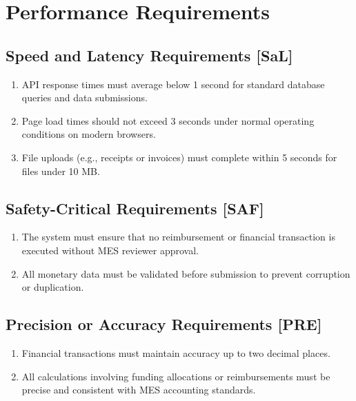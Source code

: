 \documentclass[12pt]{article}
\begin{document}
\section{Performance Requirements}
  \subsection{Speed and Latency Requirements [SaL]}
    \begin{enumerate}
        \item API response times must average below 1 second for standard database queries and data submissions.
        \item Page load times should not exceed 3 seconds under normal operating conditions on modern browsers.
        \item File uploads (e.g., receipts or invoices) must complete within 5 seconds for files under 10 MB.
    \end{enumerate}

  \subsection{Safety-Critical Requirements [SAF]}
    \begin{enumerate}
        \item The system must ensure that no reimbursement or financial transaction is executed without MES reviewer approval.
        \item All monetary data must be validated before submission to prevent corruption or duplication.
    \end{enumerate}

  \subsection{Precision or Accuracy Requirements [PRE]}
    \begin{enumerate}
        \item Financial transactions must maintain accuracy up to two decimal places.
        \item All calculations involving funding allocations or reimbursements must be precise and consistent with MES accounting standards.
    \end{enumerate}
\end{document}
